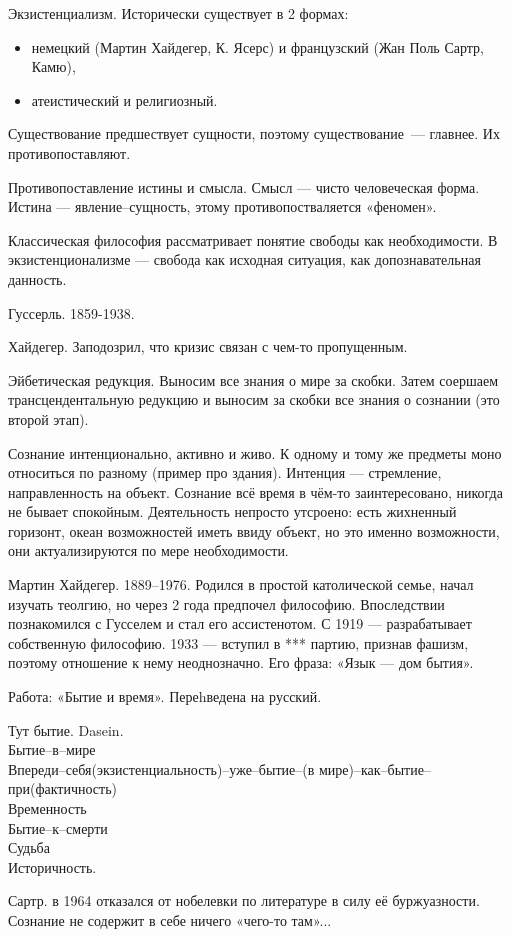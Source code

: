 Экзистенциализм.
Исторически существует в 2 формах:
\begin{itemize}
	\item немецкий (Мартин Хайдегер, К. Ясерс) и французский (Жан Поль Сартр, Камю),
	\item атеистический и религиозный.
\end{itemize}

Существование предшествует сущности, поэтому существование~--- главнее. Их противопоставляют.

Противопоставление истины и смысла. Смысл --- чисто человеческая форма. Истина --- явление--сущность, этому противопостваляется «феномен».

Классическая философия рассматривает понятие свободы как необходимости. В экзистенционализме --- свобода как исходная ситуация, как допознавательная данность.

Гуссерль. 1859-1938.

Хайдегер. Заподозрил, что кризис связан с чем-то пропущенным.

Эйбетическая редукция. Выносим все знания о мире за скобки. Затем соершаем трансцендентальную редукцию и выносим за скобки все знания о сознании (это второй этап).

Сознание интенционально, активно и живо. К одному и тому же предметы моно относиться по разному (пример про здания).
Интенция --- стремление, направленность на объект. Сознание всё время в чём-то заинтересовано, никогда не бывает спокойным. Деятельность непросто утсроено: есть жихненный горизонт, океан возможностей иметь ввиду объект, но это именно возможности, они актуализируются по мере необходимости.

Мартин Хайдегер. 1889--1976. Родился в простой католической семье, начал изучать теолгию, но через 2 года предпочел философию. Впоследствии познакомился с Гусселем и стал его ассистенотом. С 1919 --- разрабатывает собственную философию.
1933 --- вступил в *** партию, признав фашизм, поэтому отношение к нему неоднозначно.
Его фраза: «Язык --- дом бытия».

Работа: «Бытие и время». Переhведена на русский.

Тут бытие. Dasein.\\
Бытие--в--мире\\
Впереди--себя(экзистенциальность)--уже--бытие--(в мире)--как--бытие--при(фактичность)\\
Временность\\
Бытие--к--смерти\\
Судьба\\
Историчность.


Сартр.  в 1964 отказался от нобелевки по литературе в силу её буржуазности.
Сознание не содержит в себе ничего «чего-то там»...
